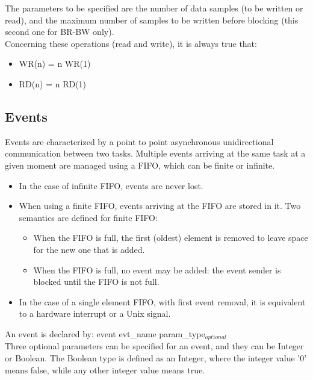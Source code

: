 \documentclass[12pt]{article}
\begin{document}
The parameters to be specified are the number of data samples (to be written or read), and the maximum number of samples to be written before blocking (this second one for BR-BW only).\\


Concerning these operations (read and write), it is always true that:
\begin{itemize}
	\item WR(n) = n WR(1)
	
	\item RD(n) = n RD(1)
\end{itemize}



\subsection{Events}

Events are characterized by a point to point asynchronous unidirectional communication between two tasks. Multiple events arriving at the same task at a given moment are managed using a FIFO, which can be finite or infinite.

\begin{itemize}
\item In the case of infinite FIFO, events are never lost.

\item When using a finite FIFO, events arriving at the FIFO are stored in it. Two semantics are defined for finite FIFO:
\begin{itemize}
\item When the FIFO is full, the first (oldest) element is removed to leave space for the new one that is added.
\item When the FIFO is full, no event may be added: the event sender is blocked until the FIFO is not full.
\end{itemize} 

\item In the case of a single element FIFO, with first event removal, it is equivalent to a hardware interrupt or a Unix signal.\\
\end{itemize}


An event is declared by: event evt\_name param\_type$_{optional}$\\

Three optional parameters can be specified for an event, and they can be Integer or Boolean. The Boolean type is defined as an Integer, where the integer value '0' means false, while any other integer value means true.\\
\end{document}
